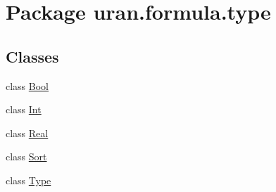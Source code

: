 \hypertarget{namespaceuran_1_1formula_1_1type}{}\section{Package uran.\+formula.\+type}
\label{namespaceuran_1_1formula_1_1type}
\subsection*{Classes}
\begin{DoxyCompactItemize}
\item 
class \hyperlink{classuran_1_1formula_1_1type_1_1_bool}{Bool}
\item 
class \hyperlink{classuran_1_1formula_1_1type_1_1_int}{Int}
\item 
class \hyperlink{classuran_1_1formula_1_1type_1_1_real}{Real}
\item 
class \hyperlink{classuran_1_1formula_1_1type_1_1_sort}{Sort}
\item 
class \hyperlink{classuran_1_1formula_1_1type_1_1_type}{Type}
\end{DoxyCompactItemize}
